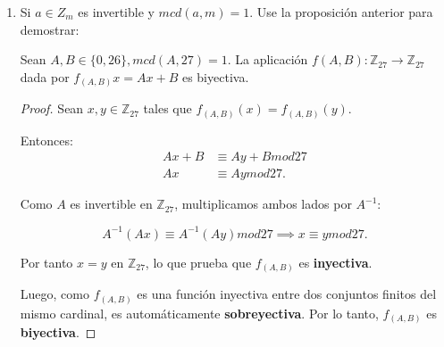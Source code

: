 \begin{enumerate}
\begin{proof}
    Combinando ambas desigualdades, se concluye que $mcd(a,b) = r_n$.
\end{proof}

\item Si $a \in Z_m$ es invertible y $mcd(a,m) = 1$. Use la proposición anterior para demostrar:

    \begin{tcolorbox}
        Sean $A, B \in \{0, 26\}, mcd(A,27)=1$. La aplicación $f(A,B) : \mathbb{Z}_{27} \to \mathbb{Z}_{27}$
        dada por $f_{(A,B)}x = Ax + B$ es biyectiva.
    \end{tcolorbox}

    \begin{proof}
    Sean $x, y \in \mathbb{Z}_{27}$ tales que $f_{(A,B)}(x) = f_{(A,B)}(y)$.

    Entonces:
    \begin{align*}
        Ax + B &\equiv Ay + B mod{27} \\
        Ax     &\equiv Ay     mod{27}.
    \end{align*}

    Como $A$ es invertible en $\mathbb{Z}_{27}$, multiplicamos ambos lados
    por $A^{-1}$:

    \[
        A^{-1}(Ax) \equiv A^{-1}(Ay) mod{27}
        \implies x \equiv y mod{27}.
    \]

    Por tanto $x = y$ en $\mathbb{Z}_{27}$, lo que prueba que $f_{(A,B)}$ es \textbf{inyectiva}.

    Luego, como $f_{(A,B)}$ es una función inyectiva entre dos conjuntos finitos del
    mismo cardinal, es automáticamente \textbf{sobreyectiva}.
    Por lo tanto, $f_{(A,B)}$ es \textbf{biyectiva}.
    \end{proof}

\end{enumerate}